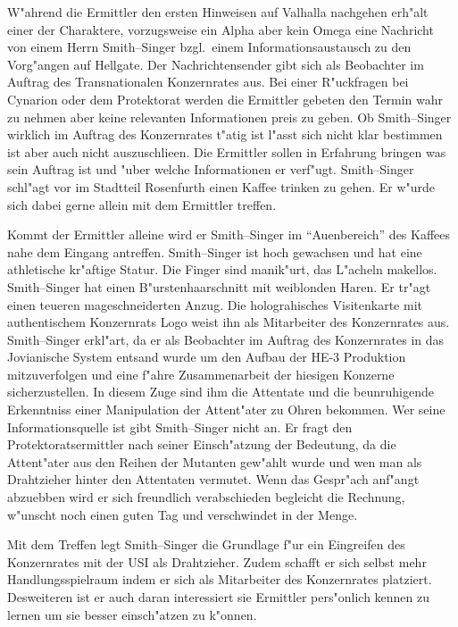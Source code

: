 W"ahrend die Ermittler den ersten Hinweisen auf Valhalla nachgehen erh"alt einer der Charaktere, vorzugsweise ein Alpha aber kein Omega eine Nachricht von einem Herrn Smith--Singer bzgl.~einem Informationsaustausch zu den Vorg"angen auf Hellgate. Der Nachrichtensender gibt sich als Beobachter im Auftrag des Transnationalen Konzernrates aus. Bei einer R"uckfragen bei Cynarion oder dem Protektorat werden die Ermittler gebeten den Termin wahr zu nehmen aber keine relevanten Informationen preis zu geben. Ob Smith--Singer wirklich im Auftrag des Konzernrates t"atig ist l"asst sich nicht klar bestimmen ist aber auch nicht auszuschlie\3en. Die Ermittler sollen in Erfahrung bringen was sein Auftrag ist und "uber welche Informationen er verf"ugt. Smith--Singer schl"agt vor im Stadtteil Rosenfurth einen Kaffee trinken zu gehen. Er w"urde sich dabei gerne allein mit dem Ermittler treffen.

Kommt der Ermittler alleine wird er Smith--Singer im "`Au\3enbereich"' des Kaffees nahe dem Eingang antreffen. Smith--Singer ist hoch gewachsen und hat eine athletische kr"aftige Statur. Die Finger sind manik"urt, das L"acheln makellos. Smith--Singer hat einen B"urstenhaarschnitt mit wei\3blonden Haren. Er tr"agt einen teueren ma\3geschneiderten Anzug. Die holograhisches Visitenkarte mit authentischem Konzernrats Logo weist ihn als Mitarbeiter des Konzernrates aus. Smith--Singer erkl"art, da\3 er als Beobachter im Auftrag des Konzernrates in das Jovianische System entsand wurde um den Aufbau der HE-3 Produktion mitzuverfolgen und eine f"ahre Zusammenarbeit der hiesigen Konzerne sicherzustellen. In diesem Zuge sind ihm die Attentate und die beunruhigende Erkenntniss einer Manipulation der Attent"ater zu Ohren bekommen. Wer seine Informationsquelle ist gibt Smith--Singer nicht an. Er fragt den Protektoratsermittler nach seiner Einsch"atzung der Bedeutung, da\3 die Attent"ater aus den Reihen der Mutanten gew"ahlt wurde und wen man als Drahtzieher hinter den Attentaten vermutet. Wenn das Gespr"ach anf"angt abzuebben wird er sich freundlich verabschieden begleicht die Rechnung, w"unscht noch einen guten Tag und verschwindet in der Menge.

Mit dem Treffen legt Smith--Singer die Grundlage f"ur ein Eingreifen des Konzernrates mit der USI als Drahtzieher. Zudem schafft er sich selbst mehr Handlungsspielraum indem er sich als Mitarbeiter des Konzernrates platziert. Desweiteren ist er auch daran interessiert sie Ermittler pers"onlich kennen zu lernen um sie besser einsch"atzen zu k"onnen.

